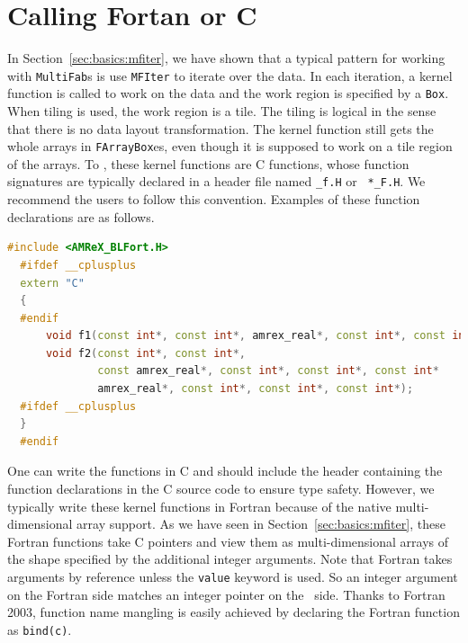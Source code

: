 {{{\section{Calling Fortan or C}
\label{sec:basics:fortran}

In Section~\ref{sec:basics:mfiter}, we have shown that a typical
pattern for working with {\tt MultiFab}s is use {\tt MFIter} to
iterate over the data.  In each iteration, a kernel function is called
to work on the data and the work region is specified by a {\tt Box}.
When tiling is used, the work region is a tile.  The tiling is logical
in the sense that there is no data layout transformation.  The kernel
function still gets the whole arrays in {\tt FArrayBox}es, even though
it is supposed to work on a tile region of the arrays.  To \cpp, these
kernel functions are C functions, whose function signatures are
typically declared in a header file named {\tt *\_f.H} or {\tt
  *\_F.H}.  We recommend the users to follow this convention.
Examples of these function declarations are as follows.
\begin{lstlisting}[language=cpp]
  #include <AMReX_BLFort.H>
  #ifdef __cplusplus
  extern "C"
  {
  #endif
      void f1(const int*, const int*, amrex_real*, const int*, const int*);
      void f2(const int*, const int*,
              const amrex_real*, const int*, const int*, const int*
              amrex_real*, const int*, const int*, const int*);
  #ifdef __cplusplus
  }
  #endif
\end{lstlisting}
One can write the functions in C and should include the header
containing the function declarations in the C source code to ensure
type safety.  However, we typically write these kernel functions in
Fortran because of the native multi-dimensional array support.   As we
have seen in Section~\ref{sec:basics:mfiter}, these Fortran functions
take C pointers and view them as multi-dimensional arrays of the shape
specified by the additional integer arguments.  Note that Fortran
takes arguments by reference unless the {\tt value} keyword is used.
So an integer argument on the Fortran side matches an integer pointer
on the \cpp\ side.  Thanks to Fortran 2003, function name mangling is
easily achieved by declaring the Fortran function as {\tt bind(c)}.

}}}

